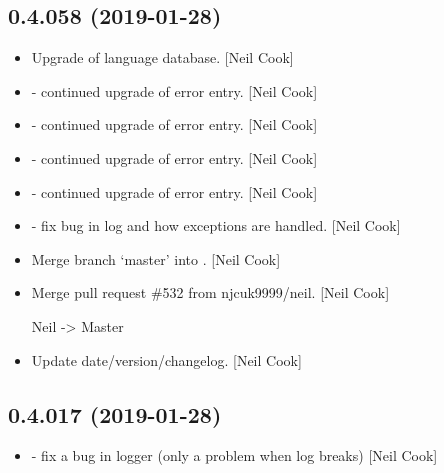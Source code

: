 \documentclass[a4paper,10pt,english]{report}
\begin{document}
\subsection{0.4.058 (2019-01-28)}
\label{\detokenize{misc/changelog:id204}}\begin{itemize}
\item {} 
Upgrade of language database. {[}Neil Cook{]}

\item {} 
 - continued upgrade of error entry. {[}Neil Cook{]}

\item {} 
 - continued upgrade of error entry. {[}Neil Cook{]}

\item {} 
 - continued upgrade of error entry. {[}Neil Cook{]}

\item {} 
 - continued upgrade of error entry. {[}Neil Cook{]}

\item {} 
 - fix bug in log and how exceptions are handled. {[}Neil
Cook{]}

\item {} 
Merge branch ‘master’ into . {[}Neil Cook{]}

\item {} 
Merge pull request \#532 from njcuk9999/neil. {[}Neil Cook{]}

Neil -\textgreater{} Master

\item {} 
Update date/version/changelog. {[}Neil Cook{]}

\end{itemize}


\subsection{0.4.017 (2019-01-28)}
\label{\detokenize{misc/changelog:id205}}\begin{itemize}
\item {} 
 - fix a bug in logger (only a problem when log breaks)
{[}Neil Cook{]}

\end{itemize}
\end{document}
